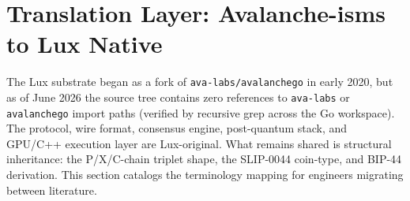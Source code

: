 
\section{Translation Layer: Avalanche-isms to Lux Native}
\label{sec:translation}

The Lux substrate began as a fork of \texttt{ava-labs/avalanchego} in early
2020, but as of June 2026 the source tree contains zero references to
\texttt{ava-labs} or \texttt{avalanchego} import paths (verified by recursive
grep across the Go workspace). The protocol, wire format, consensus engine,
post-quantum stack, and GPU/C++ execution layer are Lux-original. What
remains shared is structural inheritance: the P/X/C-chain triplet shape, the
SLIP-0044 coin-type, and BIP-44 derivation. This section catalogs the
terminology mapping for engineers migrating between literature.

